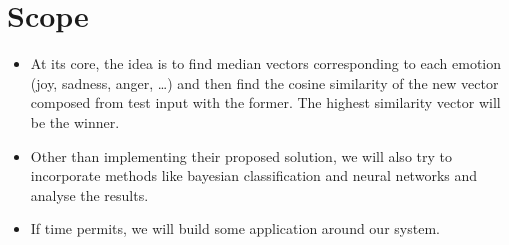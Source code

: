 \section{Scope}
\begin{itemize}
\item At its core, the idea is to find median vectors corresponding to each emotion (joy, sadness, anger, \ldots) and then find the cosine similarity of the new vector composed from test input with the former. The highest similarity vector will be the winner.
\item Other than implementing their proposed solution, we will also try to incorporate methods like bayesian classification and neural networks and analyse the results.
\item If time permits, we will build some application around our system.
\end{itemize}
